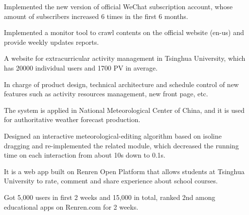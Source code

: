 \documentclass[a4paper]{rukh-cv}
\begin{document}
\begin{minipage}[t]{0.74\textwidth}
\sectionspace


\begin{tightitemize}
\item Implemented the new version of official WeChat subscription account, whose amount of subscribers increased 6 times in the first 6 months.
\item Implemented a monitor tool to crawl contents on the official website (en-us) and provide weekly updates reports.
\end{tightitemize}

\sectionspace


\begin{tightitemize}
\item A website for extracurricular activity management in Tsinghua University, which has 20000 individual users and 1700 PV in average.
\item In charge of product design, technical architecture and schedule control of new features such as activity resources management, new front page, etc.
\end{tightitemize}

\sectionspace


\begin{tightitemize}
\item The system is applied in National Meteorological Center of China, and it is used for authoritative weather forecast production.
\item Designed an interactive meteorological-editing algorithm based on isoline dragging and re-implemented the related module,
    which decreased the running time on each interaction from about 10s down to 0.1s.
\end{tightitemize}

\sectionspace


\begin{tightitemize}
\item It is a web app built on Renren Open Platform that allows students at Tsinghua University to rate, comment and share experience about school courses.
\item Got 5,000 users in first 2 weeks and 15,000 in total, ranked 2nd among educational apps on Renren.com for 2 weeks.
\end{tightitemize}


\end{minipage}
\end{document}
